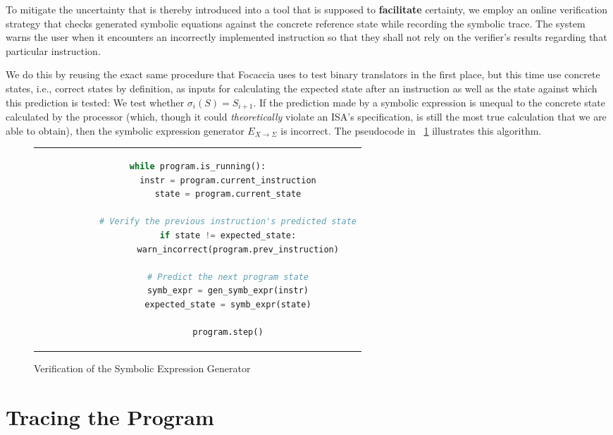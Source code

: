 To mitigate the uncertainty that is thereby introduced into a tool that is supposed to \textbf{facilitate} certainty, we
employ an online verification strategy that checks generated symbolic equations against the concrete reference state
while recording the symbolic trace. The system warns the user when it encounters an incorrectly implemented instruction
so that they shall not rely on the verifier's results regarding that particular instruction.

We do this by reusing the exact same procedure that Focaccia uses to test binary translators in the first place, but
this time use concrete states, i.e., correct states by definition, as inputs for calculating the expected state after an
instruction as well as the state against which this prediction is tested: We test whether $\sigma_i(S) = S_{i+1}$. If
the prediction made by a symbolic expression is unequal to the concrete state calculated by the processor (which, though
it could \textit{theoretically} violate an \ac{ISA}'s specification, is still the most true calculation that we are able
to obtain), then the symbolic expression generator $E_{X \rightarrow \Sigma}$ is incorrect. The pseudocode in
\figurename~\ref{fig:symb_generator_verification} illustrates this algorithm.

\begin{figure}[htbp]
    \centering
    \begin{tabular}{c}
    \begin{lstlisting}[language=Python]
        while program.is_running():
            instr = program.current_instruction
            state = program.current_state

            # Verify the previous instruction's predicted state
            if state != expected_state:
                warn_incorrect(program.prev_instruction)

            # Predict the next program state
            symb_expr = gen_symb_expr(instr)
            expected_state = symb_expr(state)

            program.step()
    \end{lstlisting}
    \end{tabular}
    \caption{Verification of the Symbolic Expression Generator}\label{fig:symb_generator_verification}
\end{figure}

\section{Tracing the Program}

